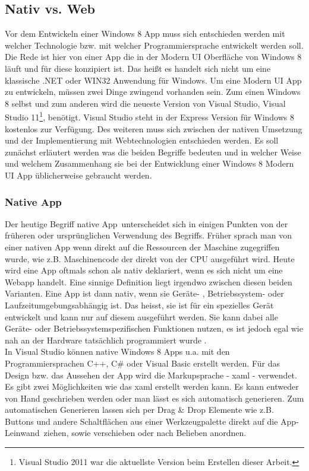 \documentclass[12pt,a4paper]{scrartcl}
\begin{document}
\subsection{Nativ vs. Web}
\label{subsec:nativ_vs_web}
Vor dem Entwickeln einer Windows 8 App muss sich entschieden werden mit welcher Technologie bzw. mit welcher Programmiersprache entwickelt werden soll. Die Rede ist hier von einer App die in der Modern UI Oberfläche von Windows 8 läuft und für diese konzipiert ist. Das heißt es handelt sich nicht um eine klassische .NET oder WIN32 Anwendung für Windows. Um eine Modern UI App zu entwickeln, müssen zwei Dinge zwingend vorhanden sein. Zum einen Windows 8 selbst und zum anderen wird die neueste Version von Visual Studio, Visual Studio 11\footnote{Visual Studio 2011 war die aktuellste Version beim Erstellen dieser Arbeit.}, benötigt. Visual Studio steht in der Express Version für Windows 8 kostenlos zur Verfügung. Des weiteren muss sich zwischen der nativen Umsetzung und der Implementierung mit Webtechnologien entschieden werden. Es soll zunächst erläutert werden was die beiden Begriffe bedeuten und in welcher Weise und welchem Zusammenhang sie bei der Entwicklung einer Windows 8 Modern UI App üblicherweise gebraucht werden.

\subsubsection{Native App}
\label{subsubsec:nativ}
Der heutige Begriff \glqq native App\grqq\ unterscheidet sich in einigen Punkten von der früheren oder ursprünglichen Verwendung des Begriffs. Früher sprach man von einer nativen App wenn direkt auf die Ressourcen der  Maschine zugegriffen wurde, wie z.B. Maschinencode der direkt von der CPU ausgeführt wird. Heute wird eine App oftmals schon als nativ deklariert, wenn es sich nicht um eine Webapp handelt. Eine sinnige Definition liegt irgendwo zwischen diesen beiden Varianten. Eine App ist dann nativ, wenn sie Geräte- , Betriebssystem- oder Laufzeitumgebungsabhängig ist. Das heisst, sie ist für ein spezielles Gerät entwickelt und kann nur auf diesem ausgeführt werden. Sie kann dabei alle Geräte- oder Betriebssystemspezifischen Funktionen nutzen, es ist jedoch egal wie nah an der Hardware tatsächlich programmiert wurde \citep{OBrian2013}.\\
In Visual Studio können native Windows 8  Apps u.a. mit den Programmiersprachen C++, C\# oder Visual Basic erstellt werden. Für das Design bzw. das Aussehen der App wird die Markupsprache - \ac{xaml} - verwendet. Es gibt zwei Möglichkeiten wie das \ac{xaml} erstellt werden kann. Es kann entweder von Hand geschrieben werden oder man lässt es sich automatisch generieren. Zum automatischen Generieren lassen sich per Drag \& Drop Elemente wie z.B. Buttons und andere Schaltflächen aus einer Werkzeugpalette direkt auf die \glqq App-Leinwand\grqq\ ziehen, sowie verschieben oder nach Belieben anordnen.
\end{document}
